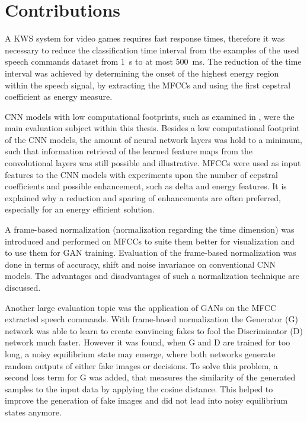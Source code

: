 
\section{Contributions}
A KWS system for video games requires fast response times, therefore it was necessary to reduce the classification time interval from the examples of the used speech commands dataset \cite{Warden2018} from \SI{1}{\second} to at most \SI{500}{\milli\second}.
The reduction of the time interval was achieved by determining the onset of the highest energy region within the speech signal, by extracting the MFCCs and using the first cepstral coefficient as energy measure.

CNN models with low computational footprints, such as examined in \cite{Sainath2015}, were the main evaluation subject within this thesis.
Besides a low computational footprint of the CNN models, the amount of neural network layers was hold to a minimum, such that information retrieval of the learned feature maps from the convolutional layers was still possible and illustrative.
MFCCs were used as input features to the CNN models with experiments upon the number of cepstral coefficients and possible enhancement, such as delta and energy features.
It is explained why a reduction and sparing of enhancements are often preferred, especially for an energy efficient solution.

A frame-based normalization (normalization regarding the time dimension) was introduced and performed on MFCCs to suite them better for visualization and to use them for GAN training.
Evaluation of the frame-based normalization was done in terms of accuracy, shift and noise invariance on conventional CNN models.
The advantages and disadvantages of such a normalization technique are discussed.

Another large evaluation topic was the application of GANs on the MFCC extracted speech commands. 
With frame-based normalization the Generator (G) network was able to learn to create convincing fakes to fool the Discriminator (D) network much faster.
However it was found, when G and D are trained for too long, a noisy equilibrium state may emerge, where both networks generate random outputs of either fake images or decisions.
To solve this problem, a second loss term for G was added, that measures the similarity of the generated samples to the input data by applying the cosine distance.
This helped to improve the generation of fake images and did not lead into noisy equilibrium states anymore.

